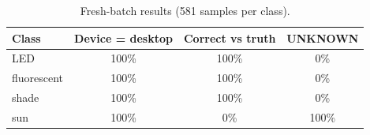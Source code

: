 
\begin{table}[!ht]
  \centering
  \caption{Fresh-batch results (581 samples per class).}
  \label{tab:heldout}
  \begin{tabular}{lccc}
    \hline
    Class & Device = desktop & Correct vs truth & UNKNOWN\\
    \hline
    LED         & 100\% & 100\% & 0\%\\
    fluorescent & 100\% & 100\% & 0\%\\
    shade       & 100\% & 100\% & 0\%\\
    sun         & 100\% & 0\%   & 100\%\\
    \hline
  \end{tabular}
\end{table}
